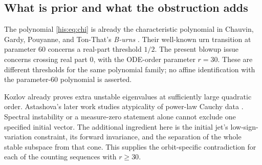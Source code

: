\subsection{What is prior and what the obstruction adds}
The polynomial \eqref{his:eq:chi} is already the characteristic polynomial in Chauvin, Gardy, Pouyanne, and Ton-That's \emph{B-urns} \cite[Section~4.1]{burns2016}. Their well-known urn transition at parameter $60$ concerns a real-part threshold $1/2$. The present blowup issue concerns crossing real part $0$, with the ODE-order parameter $r=30$. These are different thresholds for the same polynomial family; no affine identification with the parameter-$60$ polynomial is asserted.

Kozlov \cite[Lemma~5.3]{kozlov1999} already proves extra unstable eigenvalues at sufficiently large quadratic order. Astashova's later work studies atypicality of power-law Cauchy data \cite{astashova2020}. Spectral instability or a measure-zero statement alone cannot exclude one specified initial vector. The additional ingredient here is the initial jet's low-sign-variation constraint, its forward invariance, and the separation of the whole stable subspace from that cone. This supplies the orbit-specific contradiction for each of the counting sequences with $r\ge30$.
